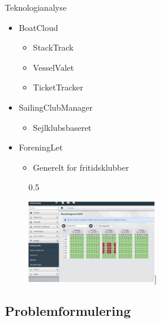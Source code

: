 \begin{frame}{Teknologianalyse}
  \begin{itemize}
    \item BoatCloud
    \begin{itemize}
      \item StackTrack
      \item VesselValet
      \item TicketTracker
    \end{itemize}
    \item SailingClubManager
    \begin{itemize}
      \item Sejlklubsbaseret
    \end{itemize}
    \item ForeningLet
    \begin{itemize}
      \item Generelt for fritidsklubber
    \end{itemize}
  \end{itemize}
    \begin{figure}{0.5\textwidth}
    
    \vspace{-30pt}
    \begin{center}
        \includegraphics[width=0.5\textwidth]{images/ForeningLet.jpg}]
    \end{center}
    \vspace{-15pt}
    \vspace{-15pt}
    \end{figure}
  
\end{frame}


\subsection{Problemformulering}

